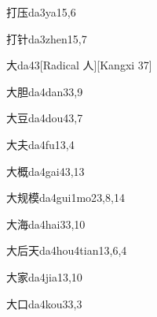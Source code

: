 \begin{verbete}{打压}{da3ya1}{5,6}
\end{verbete}

\begin{verbete}{打针}{da3zhen1}{5,7}
\end{verbete}

\begin{verbete}{大}{da4}{3}[Radical ⼈][Kangxi 37]
\end{verbete}

\begin{verbete}{大胆}{da4dan3}{3,9}
\end{verbete}

\begin{verbete}{大豆}{da4dou4}{3,7}
\end{verbete}

\begin{verbete}{大夫}{da4fu1}{3,4}
\end{verbete}

\begin{verbete}{大概}{da4gai4}{3,13}
\end{verbete}

\begin{verbete}{大规模}{da4gui1mo2}{3,8,14}
\end{verbete}

\begin{verbete}{大海}{da4hai3}{3,10}
\end{verbete}

\begin{verbete}{大后天}{da4hou4tian1}{3,6,4}
\end{verbete}

\begin{verbete}{大家}{da4jia1}{3,10}
\end{verbete}

\begin{verbete}{大口}{da4kou3}{3,3}
\end{verbete}

